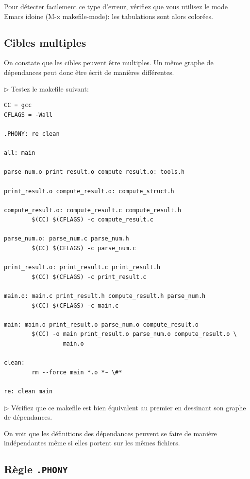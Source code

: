 \documentclass[11pt,a4paper]{article}
\newcommand{\must}{\noindent $\triangleright$ \xspace}
\begin{document}
\noindent Pour détecter facilement ce type d'erreur, vérifiez que vous
utilisez le mode \textsf{Emacs} idoine (\textsf{M-x makefile-mode}):
les tabulations sont alors colorées.

\subsection{Cibles multiples}

On constate que les cibles peuvent être multiples. Un même graphe de
dépendances peut donc être écrit de manières différentes.

\medskip

\must Testez le makefile suivant:
{\small
\begin{verbatim}
CC = gcc
CFLAGS = -Wall

.PHONY: re clean

all: main

parse_num.o print_result.o compute_result.o: tools.h

print_result.o compute_result.o: compute_struct.h

compute_result.o: compute_result.c compute_result.h
        $(CC) $(CFLAGS) -c compute_result.c

parse_num.o: parse_num.c parse_num.h
        $(CC) $(CFLAGS) -c parse_num.c

print_result.o: print_result.c print_result.h
        $(CC) $(CFLAGS) -c print_result.c

main.o: main.c print_result.h compute_result.h parse_num.h
        $(CC) $(CFLAGS) -c main.c

main: main.o print_result.o parse_num.o compute_result.o
        $(CC) -o main print_result.o parse_num.o compute_result.o \
                 main.o

clean:
        rm --force main *.o *~ \#*

re: clean main
\end{verbatim}
}

\must Vérifiez que ce makefile est bien équivalent au premier
en dessinant son graphe de dépendances.

\medskip

\noindent On voit que les définitions des dépendances peuvent se faire
de manière indépendantes même si elles portent sur les mêmes fichiers.

\subsection{Règle \texttt{.PHONY}}
\end{document}
